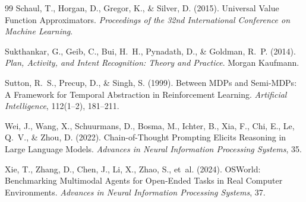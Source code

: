 \documentclass[12pt, a4paper]{article}
\begin{document}
\begin{thebibliography}{99}
Schaul, T., Horgan, D., Gregor, K., \& Silver, D. (2015).
Universal Value Function Approximators.
\textit{Proceedings of the 32nd International Conference on Machine Learning}.

Sukthankar, G., Geib, C., Bui, H.~H., Pynadath, D., \& Goldman, R.~P. (2014).
\textit{Plan, Activity, and Intent Recognition: Theory and Practice}.
Morgan Kaufmann.

Sutton, R.~S., Precup, D., \& Singh, S. (1999).
Between MDPs and Semi-MDPs: A Framework for Temporal Abstraction in Reinforcement Learning.
\textit{Artificial Intelligence}, 112(1--2), 181--211.

Wei, J., Wang, X., Schuurmans, D., Bosma, M., Ichter, B., Xia, F., Chi, E., Le, Q.~V., \& Zhou, D. (2022).
Chain-of-Thought Prompting Elicits Reasoning in Large Language Models.
\textit{Advances in Neural Information Processing Systems}, 35.

Xie, T., Zhang, D., Chen, J., Li, X., Zhao, S., et~al. (2024).
OSWorld: Benchmarking Multimodal Agents for Open-Ended Tasks in Real Computer Environments.
\textit{Advances in Neural Information Processing Systems}, 37.

\end{thebibliography}
\end{document}
